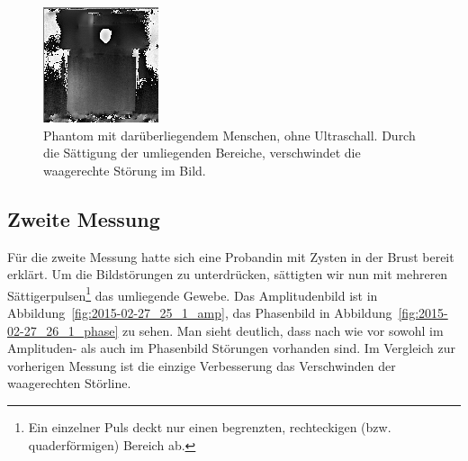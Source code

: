 \documentclass[
    11pt,
    ngerman
]{scrbook}
\begin{document}
\begin{figure}[htbp]
    \centering
    \includegraphics[width=.4\textwidth]{Abbildungen/2014-12-11_37_1_phase_us_mensch_sat.png}
    \caption{%
        Phantom mit darüberliegendem Menschen, ohne Ultraschall. Durch die Sättigung der umliegenden Bereiche, verschwindet die waagerechte Störung im Bild.
    }
    \label{fig:phantom_mensch_sat}
\end{figure}

\subsection{Zweite Messung}

Für die zweite Messung hatte sich eine Probandin mit Zysten in der Brust
bereit erklärt. Um die Bildstörungen zu unterdrücken, sättigten wir nun mit
mehreren Sättigerpulsen\footnote{Ein einzelner Puls deckt nur einen
begrenzten, rechteckigen (bzw. quaderförmigen) Bereich ab.} das umliegende
Gewebe. Das Amplitudenbild ist in Abbildung~\ref{fig:2015-02-27_25_1_amp}, das
Phasenbild in Abbildung~\ref{fig:2015-02-27_26_1_phase} zu sehen. Man sieht
deutlich, dass nach wie vor sowohl im Amplituden- als auch im Phasenbild
Störungen vorhanden sind. Im Vergleich zur vorherigen Messung ist die einzige
Verbesserung das Verschwinden der waagerechten Störline.
\end{document}
